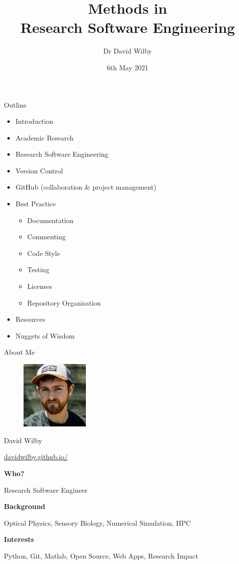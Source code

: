\documentclass{beamer} %
\title{Methods in \\Research Software Engineering}
\date{6th May 2021}
\author{Dr David Wilby}
\institute{Research Software Engineering Team,\\ The University of Sheffield}
\begin{document}
  \begin{frame}
    \titlepage
  \end{frame}

  \begin{frame}{Outline}
    \begin{itemize}
      \item Introduction
      \item Academic Research
      \item Research Software Engineering
      \item Version Control
      \item GitHub (collaboration \& project management)
      \item Best Practice
      \begin{itemize}
        \item Documentation
        \item Commenting
        \item Code Style
        \item Testing
        \item Licenses
        \item Repository Organisation
      \end{itemize}
      \item Resources
      \item Nuggets of Wisdom
    \end{itemize}
  \end{frame}

  \begin{frame}{About Me}

    \begin{figure}
        \includegraphics[width=0.3\textwidth]{wilby}
    \end{figure}

    David Wilby

    \href{https://davidwilby.github.io/}{davidwilby.github.io/}

    \textbf{Who?}
    
    Research Software Engineer

    \textbf{Background}

    Optical Physics, Sensory Biology, Numerical Simulation, HPC

    \textbf{Interests}

    Python, Git, Matlab, Open Source, Web Apps, Research Impact

  \end{frame}
\end{document}

